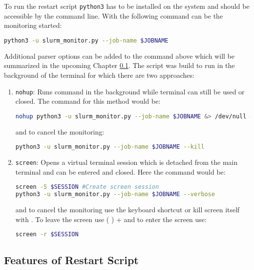 To run the restart script \texttt{python3} has to be installed on the system and should be accessible by the command line. With the following command can be the monitoring started:
\begin{lstlisting}[language=Bash]
python3 -u slurm_monitor.py --job-name $JOBNAME
\end{lstlisting}
Additional parser options can be added to the command above which will be summarized in the upcoming Chapter \ref{sub:codeFeatures}. The script was build to run in the background of the terminal for which there are two approaches:
\begin{enumerate}
    \item \texttt{nohup}: Runs command in the background while terminal can still be used or closed. \cite{nohup} The command for this method would be: \\
\begin{lstlisting}[language=Bash]
nohup python3 -u slurm_monitor.py --job-name $JOBNAME &> /dev/null &
\end{lstlisting}
and to cancel the monitoring:
\begin{lstlisting}[language=Bash]
python3 -u slurm_monitor.py --job-name $JOBNAME --kill
\end{lstlisting}
    \item \texttt{screen}: Opens a virtual terminal session which is detached from the main terminal and can be entered and closed. \cite{screen} Here the command would be:
\begin{lstlisting}[language=Bash]
screen -S $SESSION #Create screen session
python3 -u slurm_monitor.py --job-name $JOBNAME --verbose
\end{lstlisting}
and to cancel the monitoring use the keyboard shortcut  or kill screen itself with . To leave the screen use (  ) +  and to enter the screen use:
\begin{lstlisting}[language=Bash]
screen -r $SESSION
\end{lstlisting}
\end{enumerate}

\newpage
\subsection{Features of Restart Script}
\label{sub:codeFeatures}

